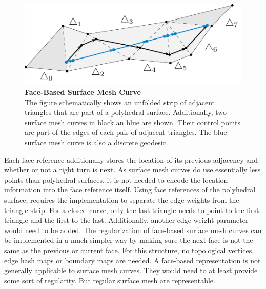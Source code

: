 \documentclass{stdlocal}
\begin{document}
  \begin{figure}
    \centering
    \includegraphics[width=0.8\linewidth]{figures/surface-mesh-curve.pdf}
    \caption[Face-Based Surface Mesh Curve]{%
      \textbf{Face-Based Surface Mesh Curve}\\
      The figure schematically shows an unfolded strip of adjacent triangles that are part of a polyhedral surface.
      Additionally, two surface mesh curves in black an blue are shown.
      Their control points are part of the edges of each pair of adjacent triangles.
      The blue surface mesh curve is also a discrete geodesic.
    }
    \label{fig:surface-mesh-curve-face-based}
  \end{figure}

  Each face reference additionally stores the location of its previous adjacency and whether or not a right turn is next.
  As surface mesh curves do use essentially less points than polyhedral surfaces, it is not needed to encode the location information into the face reference itself.
  Using face references of the polyhedral surface, requires the implementation to separate the edge weights from the triangle strip.
  For a closed curve, only the last triangle needs to point to the first triangle and the first to the last.
  Additionally, another edge weight parameter would need to be added.
  The regularization of face-based surface mesh curves can be implemented in a much simpler way by making sure the next face is not the same as the previous or current face.
  For this structure, no topological vertices, edge hash maps or boundary maps are needed.
  A face-based representation is not generally applicable to surface mesh curves.
  They would need to at least provide some sort of regularity.
  But regular surface mesh are representable.
\end{document}
